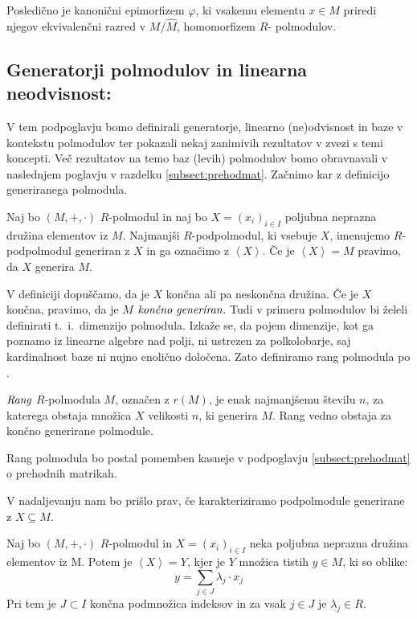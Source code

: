 \documentclass[mat1]{fmfdelo}
\newcommand{\pojem}[1]{\ensuremath{\emph{#1}}}
\newcommand{\Gen}[1]{\ensuremath{\left<{#1}\right>}}
\begin{document}
Posledično je kanonični epimorfizem $\varphi$, ki vsakemu elementu $x\in M$ priredi njegov ekvivalenčni razred v $M/\widehat{M}$, homomorfizem $R$- polmodulov.

\subsection{Generatorji polmodulov in linearna neodvisnost:} \label{subsect:base}
V tem podpoglavju bomo definirali generatorje, linearno (ne)odvisnost in baze v kontekstu polmodulov ter pokazali nekaj zanimivih rezultatov v zvezi s temi koncepti. Več rezultatov na temo baz (levih) polmodulov bomo obravnavali v naslednjem poglavju v razdelku \ref{subsect:prehodmat}. Začnimo kar z definicijo generiranega polmodula.
\begin{definicija}
	Naj bo $(M, +, \cdot)$ $R$-polmodul in naj bo $X = (x_i)_{i\in I}$ poljubna neprazna družina elementov iz $M$. Najmanjši $R$-podpolmodul, ki vsebuje $X$, imenujemo $R$-podpolmodul generiran z $X$ in ga označimo z \Gen{X}. Če je $\Gen{X} = M$ pravimo, da $X$ generira $M$.
\end{definicija}

	V definiciji dopuščamo, da je $X$ končna ali pa neskončna družina. Če je $X$ končna, pravimo, da je $M$ \pojem{končno generiran}. Tudi v primeru polmodulov bi želeli definirati t.~i.\ dimenzijo polmodula. Izkaže se, da pojem dimenzije, kot ga poznamo iz linearne algebre nad polji, ni ustrezen za polkolobarje, saj kardinalnost baze ni nujno enolično določena. Zato definiramo rang polmodula po \cite[str. 3--4]{bib:Tanbase}.

\begin{definicija}\label{def:rang}
	\pojem{Rang} $R$-polmodula $M$, označen z $r(M)$, je enak najmanjšemu številu $n$, za katerega obstaja množica $X$ velikosti $n$, ki generira $M$. Rang vedno obstaja za končno generirane polmodule.
\end{definicija}

Rang polmodula bo postal pomemben kasneje v podpoglavju \ref{subsect:prehodmat} o prehodnih matrikah.

V nadaljevanju nam bo prišlo prav, če karakteriziramo podpolmodule generirane z $X\subseteq M$.

\begin{trditev}
	Naj bo $(M, +, \cdot)$ $R$-polmodul in $X = (x_i)_{i\in I}$ neka poljubna neprazna družina elementov iz M. Potem je $\Gen{X} = Y$, kjer je $Y$  množica tistih $y\in M$, ki so oblike: $$ y = \sum_{j\in J} \lambda_j \cdot x_j$$ Pri tem je $J\subset I$ končna podmnožica indeksov in za vsak $j\in J$ je $\lambda_j \in R$.
\end{trditev}
\end{document}
